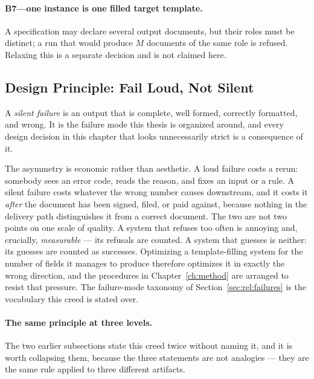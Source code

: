 \paragraph{B7---one instance is one filled target template.}
A specification may declare several output documents, but their roles must be distinct; a
run that would produce $M$ documents of the same role is refused. Relaxing this is a
separate decision and is not claimed here.

\subsection{Design Principle: Fail Loud, Not Silent}
\label{sec:design:failloud}


A \emph{silent failure} is an output that is complete, well formed, correctly formatted,
and wrong. It is the failure mode this thesis is organized around, and every design
decision in this chapter that looks unnecessarily strict is a consequence of it.

The asymmetry is economic rather than aesthetic. A loud failure costs a rerun: somebody
sees an error code, reads the reason, and fixes an input or a rule. A silent failure
costs whatever the wrong number causes downstream, and it costs it \emph{after} the
document has been signed, filed, or paid against, because nothing in the delivery path
distinguishes it from a correct document. The two are not two points on one scale of
quality. A system that refuses too often is annoying and, crucially, \emph{measurable} ---
its refusals are counted. A system that guesses is neither: its guesses are counted as
successes. Optimizing a template-filling system for the number of fields it manages to
produce therefore optimizes it in exactly the wrong direction, and the procedures in
Chapter~\ref{ch:method} are arranged to resist that pressure. The failure-mode taxonomy of
Section~\ref{sec:rel:failures} is the vocabulary this creed is stated over.

\paragraph{The same principle at three levels.}
The two earlier subsections state this creed twice without naming it, and it is worth
collapsing them, because the three statements are not analogies --- they are the same
rule applied to three different artifacts.

